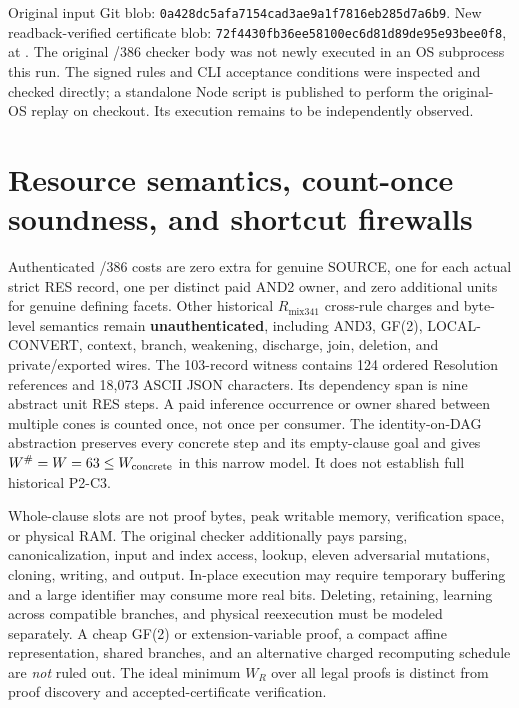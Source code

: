 \documentclass[11pt]{article}
\begin{document}
Original input Git blob: \texttt{0a428dc5afa7154cad3ae9a1f7816eb285d7a6b9}. New readback-verified certificate blob: \texttt{72f4430fb36ee58100ec6d81d89de95e93bee0f8}, at . The original /386 checker body was not newly executed in an OS subprocess this run. The signed rules and CLI acceptance conditions were inspected and checked directly; a standalone Node script is published to perform the original-OS replay on checkout. Its execution remains to be independently observed.

\section*{Resource semantics, count-once soundness, and shortcut firewalls}
Authenticated /386 costs are zero extra for genuine SOURCE, one for each actual strict RES record, one per distinct paid AND2 owner, and zero additional units for genuine defining facets. Other historical \(R_{\mathrm{mix341}}\) cross-rule charges and byte-level semantics remain \textbf{unauthenticated}, including AND3, GF(2), LOCAL-CONVERT, context, branch, weakening, discharge, join, deletion, and private/exported wires. The 103-record witness contains 124 ordered Resolution references and 18,073 ASCII JSON characters. Its dependency span is nine abstract unit RES steps. A paid inference occurrence or owner shared between multiple cones is counted once, not once per consumer. The identity-on-DAG abstraction preserves every concrete step and its empty-clause goal and gives \(W^\#=W=63\leq W_{\rm concrete}\) in this narrow model. It does not establish full historical P2-C3.

Whole-clause slots are not proof bytes, peak writable memory, verification space, or physical RAM. The original checker additionally pays parsing, canonicalization, input and index access, lookup, eleven adversarial mutations, cloning, writing, and output. In-place execution may require temporary buffering and a large identifier may consume more real bits. Deleting, retaining, learning across compatible branches, and physical reexecution must be modeled separately. A cheap GF(2) or extension-variable proof, a compact affine representation, shared branches, and an alternative charged recomputing schedule are \emph{not} ruled out. The ideal minimum \(W_R\) over all legal proofs is distinct from proof discovery and accepted-certificate verification.
\end{document}
